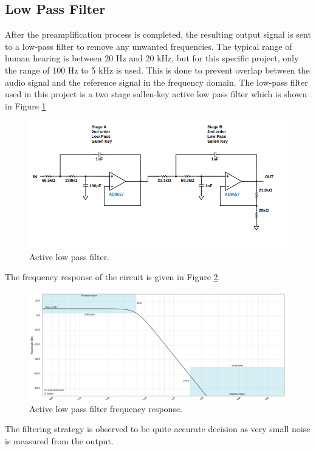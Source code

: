 \documentclass[a4paper,10pt]{IEEEtran}
\begin{document}
\subsection{Low Pass Filter}
After the preamplification process is completed, the resulting output signal is sent to a low-pass filter to remove any unwanted frequencies. The typical range of human hearing is between 20 Hz and 20 kHz, but for this specific project, only the range of 100 Hz to 5 kHz is used. This is done to prevent overlap between the audio signal and the reference signal in the frequency domain. The low-pass filter used in this project is a two stage sallen-key active low pass filter which is shown in Figure \ref{lowpass}
\begin{figure}[htbp!]
    \centering
    \includegraphics[width = 1\linewidth]{active_low_pass_circuit.png}
    \caption{Active low pass filter.}
    \label{lowpass}
\end{figure} 
The frequency response of the circuit is given in Figure \ref{lowpass_resp}.
\begin{figure}[htbp!]
    \centering
    \includegraphics[width = 1\linewidth]{active_low_pass.png}
    \caption{Active low pass filter frequency response.}
    \label{lowpass_resp}
\end{figure} 
The filtering strategy is observed to be quite accurate decision as very small noise is measured from the output. 
\end{document}
